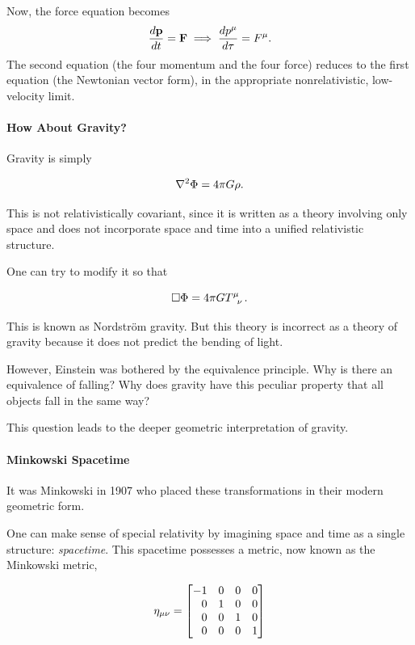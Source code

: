 		Now, the force equation becomes
		\begin{equation}
			\dv{\vb{p}}{t} = \vb{F}\implies \dv{p^\mu}{\tau} = F^\mu.
		\end{equation}
		The second equation (the four momentum and the four force) reduces to the first equation (the Newtonian vector form),  in the appropriate nonrelativistic, low-velocity limit.

	\paragraph{How About Gravity?}

		Gravity is simply

		\begin{equation}
			\lpc\Phi = 4\pi G \rho.
		\end{equation}

		This is not relativistically covariant, since it is written as a theory involving only space and does not incorporate space and time into a unified relativistic structure.

		One can try to modify it so that

		\begin{equation}
			\square \Phi = 4\pi G \tensor{T}{^\mu_\nu}.
		\end{equation}

		This is known as Nordstr\"om gravity. But this theory is incorrect as a theory of gravity because it does not predict the bending of light.

		However, Einstein was bothered by the equivalence principle. Why is there an equivalence of falling? Why does gravity have this peculiar property that all objects fall in the same way?

		This question leads to the deeper geometric interpretation of gravity.

	\paragraph{Minkowski Spacetime}

		It was Minkowski in 1907 who placed these transformations in their modern geometric form.

		One can make sense of special relativity by imagining space and time as a single structure: \textit{spacetime}. This spacetime possesses a metric, now known as the Minkowski metric,

		\begin{equation}
			\eta_{\mu\nu} =
			\bmqty{
				-1 & 0 & 0 & 0 \\
				\phantom{-}0 & 1 & 0 & 0 \\
				\phantom{-}0 & 0 & 1 & 0 \\
				\phantom{-}0 & 0 & 0 & 1
			}
		\end{equation}

